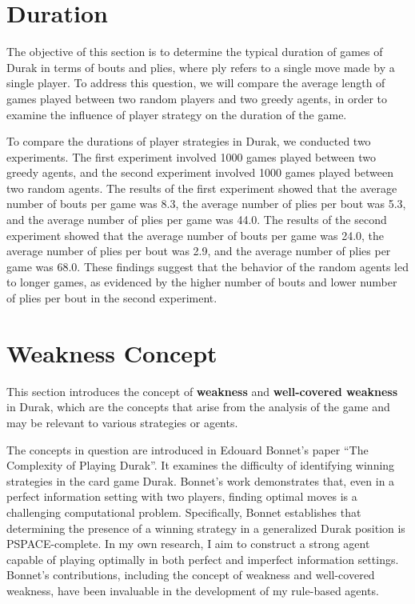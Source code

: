 \section{Duration}

The objective of this section is to determine the typical duration of games of Durak in terms of bouts and plies, where ply refers to a single move made by a single player. To address this question, we will compare the average length of games played between two random players and two greedy agents, in order to examine the influence of player strategy on the duration of the game.

To compare the durations of player strategies in Durak, we conducted two experiments. The first experiment involved 1000 games played between two greedy agents, and the second experiment involved 1000 games played between two random agents. The results of the first experiment showed that the average number of bouts per game was 8.3, the average number of plies per bout was 5.3, and the average number of plies per game was 44.0. The results of the second experiment showed that the average number of bouts per game was 24.0, the average number of plies per bout was 2.9, and the average number of plies per game was 68.0. These findings suggest that the behavior of the random agents led to longer games, as evidenced by the higher number of bouts and lower number of plies per bout in the second experiment.

\section{Weakness Concept}
\label{weaknessConcept}
This section introduces the concept of \textbf{weakness} and \textbf{well-covered weakness} in Durak, which are the concepts that arise from the analysis of the game and may be relevant to various strategies or agents.

The concepts in question are introduced in Edouard Bonnet's paper ``The Complexity of Playing Durak''. It examines the difficulty of identifying winning strategies in the card game Durak. Bonnet's work demonstrates that, even in a perfect information setting with two players, finding optimal moves is a challenging computational problem. Specifically, Bonnet establishes that determining the presence of a winning strategy in a generalized Durak position is PSPACE-complete. In my own research, I aim to construct a strong agent capable of playing optimally in both perfect and imperfect information settings. Bonnet's contributions, including the concept of weakness and well-covered weakness, have been invaluable in the development of my rule-based agents.

